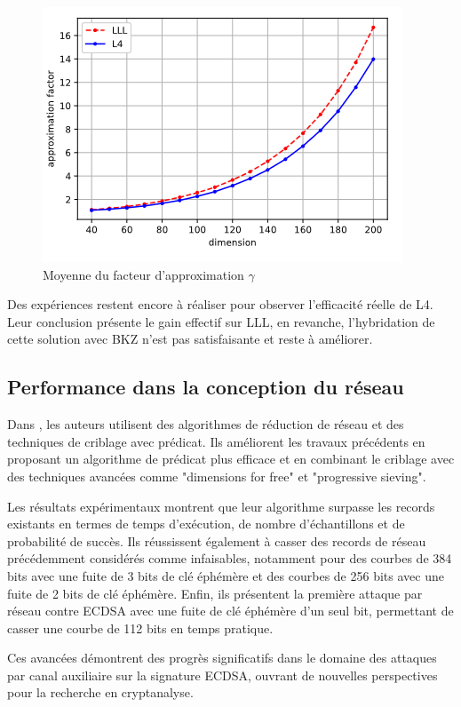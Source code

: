 \documentclass{backend}
\begin{document}
\begin{figure}[H]
    \centering
    \includegraphics[scale = 0.5]{img/LLL&L4.png}
    \caption{Moyenne du facteur d'approximation $\gamma$}
    \label{fig:LLL&l4}
\end{figure}

Des expériences restent encore à réaliser pour observer l'efficacité réelle de L4. Leur conclusion présente le gain effectif sur LLL, en revanche, l'hybridation de cette solution avec BKZ n'est pas satisfaisante et reste à améliorer.


\subsection{Performance dans la conception du réseau}

Dans \cite{improvedECDSA}, les auteurs utilisent des algorithmes de réduction de réseau et des techniques de criblage avec prédicat. Ils améliorent les travaux précédents en proposant un algorithme de prédicat plus efficace et en combinant le criblage avec des techniques avancées comme "dimensions for free" et "progressive sieving". \smallbreak

Les résultats expérimentaux montrent que leur algorithme surpasse les records existants en termes de temps d'exécution, de nombre d'échantillons et de probabilité de succès. Ils réussissent également à casser des records de réseau précédemment considérés comme infaisables, notamment pour des courbes de 384 bits avec une fuite de 3 bits de clé éphémère et des courbes de 256 bits avec une fuite de 2 bits de clé éphémère. Enfin, ils présentent la première attaque par réseau contre ECDSA avec une fuite de clé éphémère d'un seul bit, permettant de casser une courbe de 112 bits en temps pratique.

Ces avancées démontrent des progrès significatifs dans le domaine des attaques par canal auxiliaire sur la signature ECDSA, ouvrant de nouvelles perspectives pour la recherche en cryptanalyse.
\end{document}
